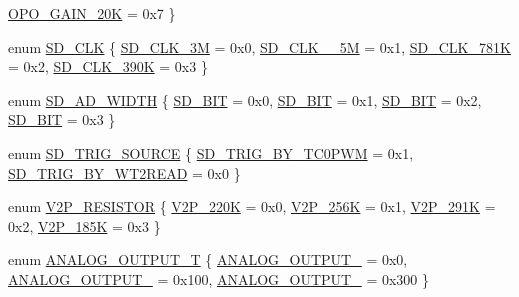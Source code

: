 \begin{DoxyCompactItemize}
\mbox{\hyperlink{a00002_a6424f6db97a2e691b73af9c4053f1650a44bf632448f2bed40aad8456d4ab211e}{O\+P\+O\+\_\+\+G\+A\+I\+N\+\_\+20K}} = 0x7
 \}
\item 
enum \mbox{\hyperlink{a00002_aebc3424fa91b715741f0320561ecfbb0}{S\+D\+\_\+\+C\+LK}} \{ \mbox{\hyperlink{a00002_aebc3424fa91b715741f0320561ecfbb0a720c5991be73063f5ab035440f26b486}{S\+D\+\_\+\+C\+L\+K\+\_\+3M}} = 0x0, 
\mbox{\hyperlink{a00002_aebc3424fa91b715741f0320561ecfbb0a5241c8457df3f987f10797b36db20771}{S\+D\+\_\+\+C\+L\+K\+\_\+\_\+5M}} = 0x1, 
\mbox{\hyperlink{a00002_aebc3424fa91b715741f0320561ecfbb0a37bbada3115f676b49cc087c5caac0d3}{S\+D\+\_\+\+C\+L\+K\+\_\+781K}} = 0x2, 
\mbox{\hyperlink{a00002_aebc3424fa91b715741f0320561ecfbb0ace583ebd6e97c856a883187711ea4226}{S\+D\+\_\+\+C\+L\+K\+\_\+390K}} = 0x3
 \}
\item 
enum \mbox{\hyperlink{a00002_a44030e617a742aba101c6dcd3ec2078e}{S\+D\+\_\+\+A\+D\+\_\+\+W\+I\+D\+TH}} \{ \mbox{\hyperlink{a00002_a44030e617a742aba101c6dcd3ec2078ea9c86002a4a99d0d440bca9b7f8d2ec93}{S\+D\+\_\+B\+IT}} = 0x0, 
\mbox{\hyperlink{a00002_a44030e617a742aba101c6dcd3ec2078ea43562124882d2ecf1ce1b062c46e035c}{S\+D\+\_\+B\+IT}} = 0x1, 
\mbox{\hyperlink{a00002_a44030e617a742aba101c6dcd3ec2078eacac5c6814a8f28e35ebeef99751a9d5f}{S\+D\+\_\+B\+IT}} = 0x2, 
\mbox{\hyperlink{a00002_a44030e617a742aba101c6dcd3ec2078ea3a9f3242e2567dcfb29f566e45cf6de0}{S\+D\+\_\+B\+IT}} = 0x3
 \}
\item 
enum \mbox{\hyperlink{a00002_ab266bb772aaf5cffad6bede99cfb094c}{S\+D\+\_\+\+T\+R\+I\+G\+\_\+\+S\+O\+U\+R\+CE}} \{ \mbox{\hyperlink{a00002_ab266bb772aaf5cffad6bede99cfb094ca2da9ae6568d907b90ab68f56f8605ada}{S\+D\+\_\+\+T\+R\+I\+G\+\_\+\+B\+Y\+\_\+\+T\+C0\+P\+WM}} = 0x1, 
\mbox{\hyperlink{a00002_ab266bb772aaf5cffad6bede99cfb094ca9596adcc3a82f8e983e664a6ed5144a6}{S\+D\+\_\+\+T\+R\+I\+G\+\_\+\+B\+Y\+\_\+\+W\+T2\+R\+E\+AD}} = 0x0
 \}
\item 
enum \mbox{\hyperlink{a00002_a80255c41c3764feff9b79664f15feb46}{V2\+P\+\_\+\+R\+E\+S\+I\+S\+T\+OR}} \{ \mbox{\hyperlink{a00002_a80255c41c3764feff9b79664f15feb46a1ac9774056594cac22ae2c6431fa4277}{V2\+P\+\_\+220K}} = 0x0, 
\mbox{\hyperlink{a00002_a80255c41c3764feff9b79664f15feb46a4b7eb698a06cc149cbb1b7f8f4dd4a8e}{V2\+P\+\_\+256K}} = 0x1, 
\mbox{\hyperlink{a00002_a80255c41c3764feff9b79664f15feb46ae20e5b8adb1fa31fa8df9a56d05e7eb5}{V2\+P\+\_\+291K}} = 0x2, 
\mbox{\hyperlink{a00002_a80255c41c3764feff9b79664f15feb46aa035ba8725fe8565c5505a295c22ea8e}{V2\+P\+\_\+185K}} = 0x3
 \}
\item 
enum \mbox{\hyperlink{a00002_ae9e6d7c812d9175f04b9a2d31a74f737}{A\+N\+A\+L\+O\+G\+\_\+\+O\+U\+T\+P\+U\+T\+\_\+T}} \{ \mbox{\hyperlink{a00002_ae9e6d7c812d9175f04b9a2d31a74f737acddac909ab33947534e48dd4db264d74}{A\+N\+A\+L\+O\+G\+\_\+\+O\+U\+T\+P\+U\+T\+\_}} = 0x0, 
\mbox{\hyperlink{a00002_ae9e6d7c812d9175f04b9a2d31a74f737ae3e86cb61e54d2d71a936d57768b2c04}{A\+N\+A\+L\+O\+G\+\_\+\+O\+U\+T\+P\+U\+T\+\_}} = 0x100, 
\mbox{\hyperlink{a00002_ae9e6d7c812d9175f04b9a2d31a74f737a778485bb7dac9a00dadf2d72aa1606e1}{A\+N\+A\+L\+O\+G\+\_\+\+O\+U\+T\+P\+U\+T\+\_}} = 0x300
 \}
\end{DoxyCompactItemize}

